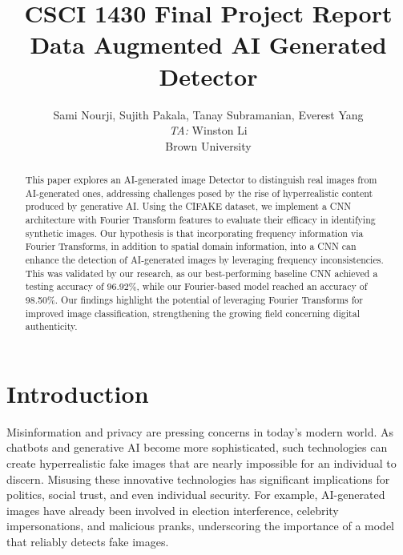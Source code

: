 \title{CSCI 1430 Final Project Report\\Data Augmented AI Generated Detector}

\author{
Sami Nourji, Sujith Pakala, Tanay Subramanian, Everest Yang\\
    \emph{TA:} Winston Li \\
    Brown University\\
}

\maketitle

\begin{abstract}
    This paper explores an AI-generated image Detector to distinguish real images from AI-generated ones, addressing challenges posed by the rise of hyperrealistic content produced by generative AI. Using the CIFAKE dataset, we implement a CNN architecture with Fourier Transform features to evaluate their efficacy in identifying synthetic images. Our hypothesis is that incorporating frequency information via Fourier Transforms, in addition to spatial domain information, into a CNN can enhance the detection of AI-generated images by leveraging frequency inconsistencies. This was validated by our research, as our best-performing baseline CNN achieved a testing accuracy of 96.92\%, while our Fourier-based model reached an accuracy of 98.50\%. Our findings highlight the potential of leveraging Fourier Transforms for improved image classification, strengthening the growing field concerning digital authenticity.\end{abstract}

\section{Introduction}

Misinformation and privacy are pressing concerns in today’s modern world. As chatbots and generative AI become more sophisticated, such technologies can create hyperrealistic fake images that are nearly impossible for an individual to discern. Misusing these innovative technologies has significant implications for politics, social trust, and even individual security. For example, AI-generated images have already been involved in election interference, celebrity impersonations, and malicious pranks, underscoring the importance of a model that reliably detects fake images.


